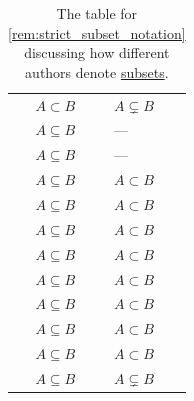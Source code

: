 \begin{remark}
\begin{table}
\begin{tabular}{l l l}
      \cite[13]{ШеньВерещагин2020НачалаТеорииМножеств}                & \( A \subset B \)   & \( A \subsetneq B \) \\
      \cite[17]{Kunen2013SetTheory}                                   & \( A \subseteq B \) & ---                  \\
      \cite[159]{Enderton1977SetTheory}                               & \( A \subseteq B \) & ---                  \\
      \cite[3]{Harzheim2005OrderedSets}                               & \( A \subseteq B \) & \( A \subset B \)    \\
      \cite[7]{Savage1998ModelsOfComputation}                         & \( A \subseteq B \) & \( A \subset B \)    \\
      \cite[135]{Kleene2002Logic}                                     & \( A \subseteq B \) & \( A \subset B \)    \\
      \cite[503]{Müller2022HandbookOfDynamicsAndProbability}          & \( A \subseteq B \) & \( A \subset B \)    \\
      \cite[def. 2.1.3]{Rosen2019DiscreteMathematics}                 & \( A \subseteq B \) & \( A \subset B \)    \\
      \cite[def. 1.1]{Александров1977ОбщаяТопология}                  & \( A \subseteq B \) & \( A \subset B \)    \\
      \cite[10]{Мальцев1970АлгебраическиеСистемы}                     & \( A \subseteq B \) & \( A \subset B \)    \\
      \cite[33]{БелоусовТкачёв2004ДискретнаяМатематика}               & \( A \subseteq B \) & \( A \subset B \)    \\
      \cite[def. 3.1.14]{Tao2022AnalysisI}                            & \( A \subseteq B \) & \( A \subsetneq B \) \\
      \bottomrule
    \end{tabular}
    \caption{The table for \cref{rem:strict_subset_notation} discussing how different authors denote \hyperref[def:subset]{subsets}.}\label{tab:rem:strict_subset_notation}
  \end{table}
\end{remark}

